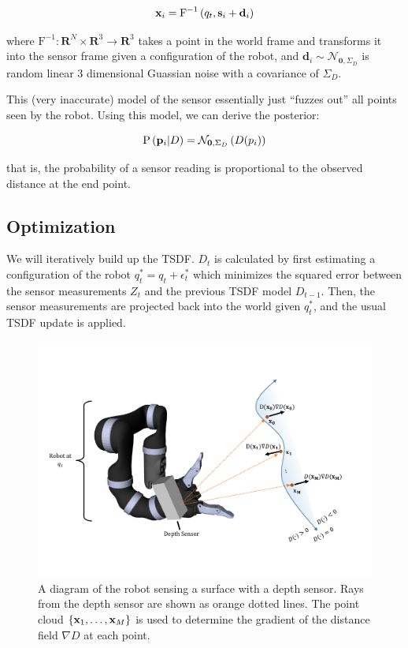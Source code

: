 \documentclass{article}
\begin{document}
\begin{equation}
\mathbf{x}_i = \text{F}^{-1}\left(q_t, \mathbf{s}_i +\mathbf{d}_i\right)
\end{equation}

\noindent where $\text{F}^{-1} : \mathbf{R}^N \times \mathbf{R}^3 \to \mathbf{R}^3$ takes a point in the world frame and transforms it into the sensor frame given a configuration of the robot,  and $\mathbf{d}_i \sim \mathcal{N}_{\mathbf{0},
\Sigma_D}$ is random linear 3 dimensional Guassian noise with a covariance of $\Sigma_D$.

This (very inaccurate) model of the sensor essentially just ``fuzzes out'' all points seen by the robot.  Using this model, we can derive the posterior:

\begin{equation}
\text{P} \left(\mathbf{p}_i | D \right) = \mathcal{N}_{\mathbf{0}, \Sigma_D}\left(D(p_i) \right)
\end{equation} 

\noindent that is, the probability of a sensor reading is proportional to the observed distance at the end point.

\subsection{Optimization} 

We will iteratively build up the TSDF. $D_t$ is calculated by first estimating a
configuration of the robot $q^*_t = q_t + \epsilon^*_t$ which minimizes the
squared error between the sensor measurements $Z_t$ and the previous TSDF model
$D_{t - 1}$.  Then, the sensor measurements are projected back into the world
given $q^*_t$, and the usual TSDF update is applied.

\begin{figure}
	\centering
	\includegraphics[width=1.0\textwidth]{img/robot_reconstruct.pdf}
	\caption{A diagram of the robot sensing a surface with a depth sensor. Rays
	from the depth sensor are shown as orange dotted lines. The point cloud
	$\{\mathbf{x}_1, \ldots, \mathbf{x}_M\}$ is used to determine the gradient of the distance
	field $\nabla D$ at each point.}
	\label{fig:robot} 
\end{figure}
\end{document}
